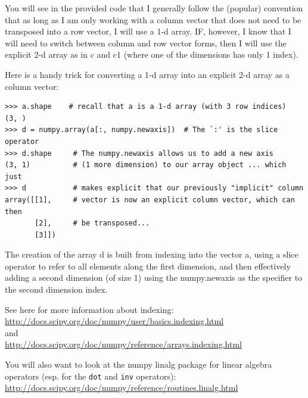 \documentclass[10pt]{article}
\begin{document}
You will see in the provided code that I generally follow the (popular) convention that as long as I am only working with a column vector that does not need to be transposed into a row vector, I will use a 1-d array.  IF, however, I know that I will need to switch between column and row vector forms, then I will use the explicit 2-d array as in c and c1 (where one of the dimensions has only 1 index).

Here is a handy trick for converting a 1-d array into an explicit 2-d array as a column vector:
\begin{verbatim}
>>> a.shape    # recall that a is a 1-d array (with 3 row indices)
(3, )
>>> d = numpy.array(a[:, numpy.newaxis])  # The `:' is the slice operator
>>> d.shape     # The numpy.newaxis allows us to add a new axis 
(3, 1)          # (1 more dimension) to our array object ... which just 
>>> d           # makes explicit that our previously "implicit" column 
array([[1],     # vector is now an explicit column vector, which can then
       [2],     # be transposed...
       [3]])
\end{verbatim}
The creation of the array d is built from indexing into the vector a, using a slice operator to refer to all elements along the first dimension, and then effectively adding a second dimension (of size 1) using the numpy.newaxis as the specifier to the second dimension index.

See here for more information about indexing: \\
\url{http://docs.scipy.org/doc/numpy/user/basics.indexing.html}\\
and\\
\url{http://docs.scipy.org/doc/numpy/reference/arrays.indexing.html}

You will also want to look at the numpy linalg package for linear algebra operators (esp. for the {\tt dot} and {\tt inv} operators):\\
\url{http://docs.scipy.org/doc/numpy/reference/routines.linalg.html}
\end{document}
